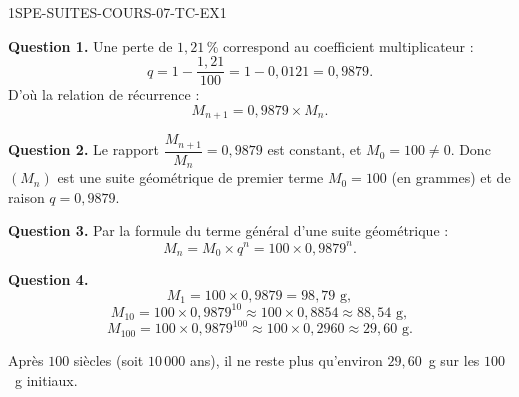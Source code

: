 \begin{corrige}{1SPE-SUITES-COURS-07-TC-EX1}


\textbf{Question 1.} Une perte de $1{,}21\,\%$ correspond au coefficient multiplicateur :
\[
  q = 1 - \frac{1{,}21}{100} = 1 - 0{,}0121 = 0{,}9879.
\]
D'où la relation de récurrence :
\[
  M_{n+1} = 0{,}9879 \times M_n.
\]

\textbf{Question 2.} Le rapport $\dfrac{M_{n+1}}{M_n} = 0{,}9879$ est constant, et $M_0 = 100
\neq 0$. Donc $(M_n)$ est une suite géométrique de premier terme $M_0 = 100$ (en grammes) et de raison $q = 0{,}9879$.

\textbf{Question 3.} Par la formule du terme général d'une suite géométrique :
\[
  M_n = M_0 \times q^n = 100 \times 0{,}9879^n.
\]

\textbf{Question 4.}
\[
  M_1 = 100 \times 0{,}9879 = 98{,}79 \text{ g},
\]
\[
  M_{10} = 100 \times 0{,}9879^{10} \approx 100 \times 0{,}8854 \approx 88{,}54 \text{ g},
\]
\[
  M_{100} = 100 \times 0{,}9879^{100} \approx 100 \times 0{,}2960 \approx 29{,}60 \text{ g.}
\]


Après $100$ siècles (soit $10\,000$ ans), il ne reste plus qu'environ $29{,}60$~g sur les $100$~g initiaux.

\end{corrige}

\bigskip


